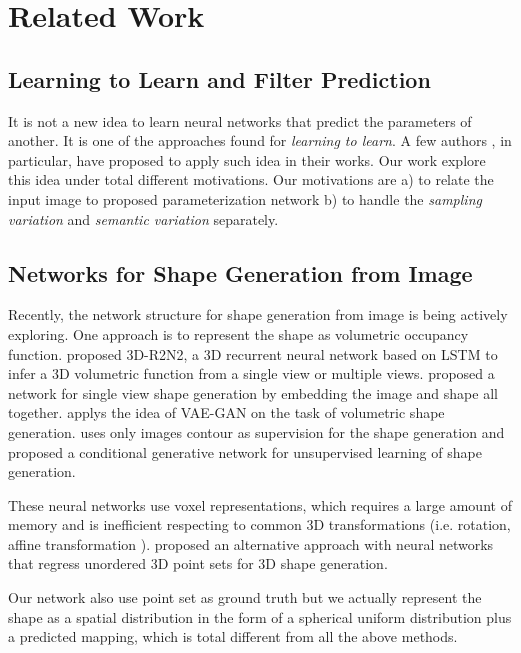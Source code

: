 \section{Related Work}
\subsection{Learning to Learn and Filter Prediction}
It is not a new idea to learn neural networks that predict the parameters of another. It is one of the approaches found for \textit{learning to learn}.  A few authors \cite{schmidhuber1992learning,bertinetto2016learning,jia2016dynamic} , in particular, have proposed to apply such idea in their works. Our work explore this idea under total different motivations. Our motivations are a) to relate the input image to proposed parameterization network b) to handle the \textit{sampling variation} and \textit{semantic variation} separately. 

\subsection{Networks for Shape Generation from Image}
Recently, the network structure for shape generation from image is being actively exploring. One approach is to represent the shape as volumetric occupancy function. \cite{3DR2N2} proposed 3D-R2N2, a 3D recurrent neural network based on LSTM to infer a 3D volumetric function from a single view or multiple views. \cite{girdhar2016learning} proposed a network for single view shape generation by embedding the image and shape all together. \cite{NIPS2016_6096} applys the idea of VAE-GAN on the task of volumetric shape generation. \cite{NIPS2016_6206} uses only images contour as supervision for the shape generation and \cite{NIPS2016_6600} proposed a conditional generative network for unsupervised learning of shape generation. 

These neural networks use voxel representations, which
requires a large amount of memory and is inefficient respecting to common 3D transformations (i.e. rotation, affine transformation ). \cite{PSGN} proposed an alternative approach with neural networks that regress unordered
3D point sets for 3D shape generation. 

Our network also use point set as ground truth but we actually represent the shape as a spatial distribution in the form of a spherical uniform distribution plus a predicted mapping, which is total different from all the above methods. 

